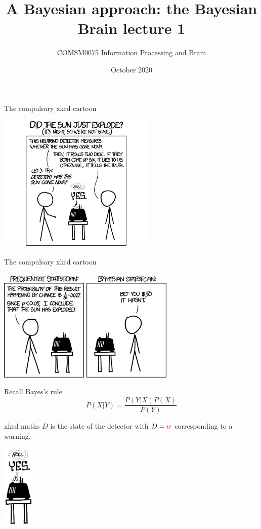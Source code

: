 \documentclass{beamer}
\title[The Bayesian Brain lecture 1]{A Bayesian approach: the Bayesian Brain lecture 1}
\author{COMSM0075 Information Processing and Brain}
\institute{\texttt{comsm0075.github.io}}
\date{October 2020}
\newcommand{\crish}{\color{reddish}}
\newcommand{\cbla}{\color{black}}
\newcommand{\cred}{\color{red}}
\begin{document}
\maketitle

\begin{frame}{The compulsary xkcd cartoon}
\begin{center}
\includegraphics[width=7.5cm]{xkcd1.png}
\end{center}
\vfill
{}
\end{frame}


\begin{frame}{The compulsary xkcd cartoon}
\begin{center}
\includegraphics[width=8.5cm]{xkcd2.png}
\end{center}
\vfill
{}
\end{frame}

\begin{frame}{Recall Bayes's rule}
  \crish$$
  P(X|Y)=\frac{P(Y|X)P(X)}{P(Y)}
  $$\cbla
\end{frame}

\begin{frame}{xkcd maths}
  \crish$D$\cbla{} is the state of the detector with
  \crish$D=\cred{}w$\cbla{} corresponding to a \cred{}warning\cbla{}.
\begin{center}
\includegraphics[width=1.5cm]{xkcd_detector.png}
\end{center}
\end{frame}
\end{document}
